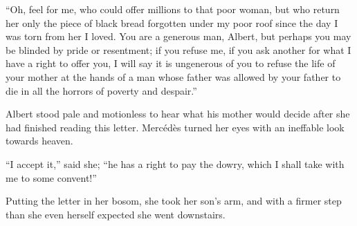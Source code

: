 “Oh, feel for me, who could offer millions to that poor woman, but who
return her only the piece of black bread forgotten under my poor roof
since the day I was torn from her I loved. You are a generous man,
Albert, but perhaps you may be blinded by pride or resentment; if you
refuse me, if you ask another for what I have a right to offer you, I
will say it is ungenerous of you to refuse the life of your mother at
the hands of a man whose father was allowed by your father to die in
all the horrors of poverty and despair.”

Albert stood pale and motionless to hear what his mother would decide
after she had finished reading this letter. Mercédès turned her eyes
with an ineffable look towards heaven.

“I accept it,” said she; “he has a right to pay the dowry, which I
shall take with me to some convent!”

Putting the letter in her bosom, she took her son’s arm, and with a
firmer step than she even herself expected she went downstairs.
